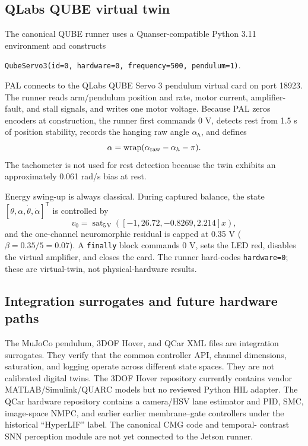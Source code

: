 \documentclass[10pt,twocolumn]{article}
\newcommand{\sat}{\operatorname{sat}}
\newcommand{\T}{^{\mathsf T}}
\begin{document}
\subsection{QLabs QUBE virtual twin}

The canonical QUBE runner uses a Quanser-compatible Python 3.11 environment and
constructs
\begin{center}
\texttt{QubeServo3(id=0, hardware=0, frequency=500, pendulum=1)}.
\end{center}
PAL connects to the QLabs QUBE Servo 3 pendulum virtual card on port 18923. The
runner reads arm/pendulum position and rate, motor current, amplifier-fault, and
stall signals, and writes one motor voltage. Because PAL zeros encoders at
construction, the runner first commands 0 V, detects rest from 1.5 s of position
stability, records the hanging raw angle $\alpha_h$, and defines
\begin{equation}
    \alpha=\operatorname{wrap}(\alpha_{\rm raw}-\alpha_h-\pi).
\end{equation}
The tachometer is not used for rest detection because the twin exhibits an
approximately 0.061 rad/s bias at rest.

Energy swing-up is always classical. During captured balance, the state
$[\theta,\alpha,\dot\theta,\dot\alpha]\T$ is controlled by
\begin{equation}
    v_0=\sat_{5\,\mathrm V}
    ([-1,26.72,-0.8269,2.214]x),
\end{equation}
and the one-channel neuromorphic residual is capped at 0.35 V
($\beta=0.35/5=0.07$). A \texttt{finally} block commands 0 V, sets the LED red,
disables the virtual amplifier, and closes the card. The runner hard-codes
\texttt{hardware=0}; these are virtual-twin, not physical-hardware results.

\subsection{Integration surrogates and future hardware paths}

The MuJoCo pendulum, 3DOF Hover, and QCar XML files are integration surrogates.
They verify that the common controller API, channel dimensions, saturation, and
logging operate across different state spaces. They are not calibrated digital
twins. The 3DOF Hover repository currently contains vendor MATLAB/Simulink/QUARC
models but no reviewed Python HIL adapter. The QCar hardware repository contains
a camera/HSV lane estimator and PID, SMC, image-space NMPC, and earlier
earlier membrane--gate controllers under the historical ``HyperLIF'' label. The
canonical CMG code and temporal-
contrast SNN perception module are not yet connected to the Jetson runner.
\end{document}
